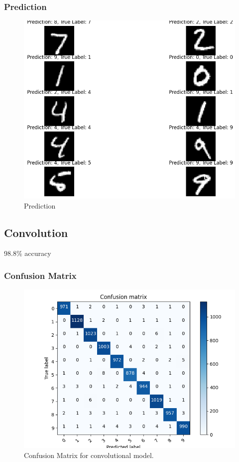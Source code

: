 \documentclass{article}
\begin{document}
\subsubsection{Prediction}
\begin{figure}
    \centering
    \includegraphics[width=\textwidth]{media/prediction/4.png}
    \caption{Prediction}
    \label{fig:Prediction}
\end{figure}
\subsection{Convolution}
98.8\% accuracy
\subsubsection{Confusion Matrix}
\begin{figure}
    \centering
    \includegraphics[width=\textwidth]{media/convolution/Figure_1.png}
    \caption{Confusion Matrix for convolutional model.}
    \label{fig:convolution_confusion}
\end{figure}
\end{document}
